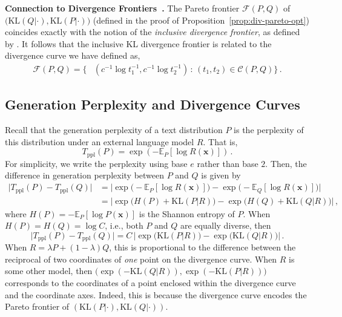 \documentclass{article}
\newcommand{\myparagraph}[1]{\par\noindent\textbf{{#1}.}} %
\newcommand \Fcal {\mathcal F}
\newcommand \Ccal {\mathcal C}
\newcommand \xv {\bm{x}}
\newcommand \e {e}
\theoremstyle{definition}
\newcommand{\kl}{{\mathrm{KL}}}
\newcommand \expect {\mathbb{E}}
\begin{document}
\myparagraph{Connection to Divergence Frontiers~\citep{djolonga2020precision}}
The Pareto frontier $\Fcal(P, Q)$ 
of $\big(\kl(Q|\cdot), \kl(P | \cdot)\big)$ 
(defined in the proof of Proposition~\ref{prop:div-pareto-opt})
coincides exactly with the notion 
of the {\em inclusive divergence frontier}, 
as defined by \citet{djolonga2020precision}.
It follows that the 
inclusive KL divergence frontier 
is related to the divergence curve we have defined as, 
\begin{align*}
    \Fcal(P, Q) 
    = \Big\{  &
        \left(
        c^{-1} \log t_1^{-1},
        c^{-1} \log t_2^{-1}
        \right) 
        \, : \, 
          (t_1, t_2) \in \Ccal(P, Q)
    \Big\} \,.
\end{align*}


%
%
%
%
%
%
%
%
%
%
%
%

%
%
%
%
%
%
%
%
%


%
%

%
%
%
%
%
%
%

%
%
%
%
%
%
%
%
%
%
%
%
%

%
%
%
%
%
%

%
%
%
%
%
%
%
%
%
%
%
%
%
%




\subsection{Generation Perplexity and Divergence Curves}
\label{supp:pr:genppl}
Recall that the generation perplexity of a text distribution $P$ is the perplexity of this distribution under an external language model $R$. That is, 
\[
    T_{\text{ppl}}(P) = \exp\left( - \expect_P[\log R(\xv)] \right) \, .
\]
For simplicity, we write the perplexity using base $\e$ rather than base $2$. 
Then, the difference in generation perplexity between $P$ and $Q$ is given by 
\begin{align*}
    \big|T_{\text{ppl}}(P) - T_{\text{ppl}}(Q)\big| 
    &= \Big|\exp\big(- \expect_P[\log R(\xv)]\big) - \exp\big(- \expect_Q[\log R(\xv)] \big) \Big| \\
    &= \Big|\exp\big(H(P) + \kl(P | R)\big) - \exp\big(H(Q) + \kl(Q | R)\big) \Big| \,,
\end{align*}
where $H(P) = -\expect_P[\log P(\xv)]$ is the Shannon entropy of $P$. 
When $H(P) = H(Q) = \log C$, i.e., both $P$ and $Q$ are equally diverse, then 
\[
     \big|T_{\text{ppl}}(P) - T_{\text{ppl}}(Q)\big|
     = C\,  \Big|\exp\big(\kl(P | R)\big) - \exp\big(\kl(Q | R)\big) \Big| \,.
\]
When $R = \lambda P + (1-\lambda)Q$, this is proportional to the difference between the reciprocal of two coordinates of {\em one} point on the divergence curve.
When $R$ is some other model, then $\big(\exp(-\kl(Q| R)), \exp(-\kl(P|R))\big)$ corresponds to the coordinates of a point enclosed within the divergence curve and the coordinate axes. Indeed, this is because the divergence curve encodes the Pareto frontier of $(\kl(P | \cdot), \kl(Q| \cdot))$.
\end{document}
